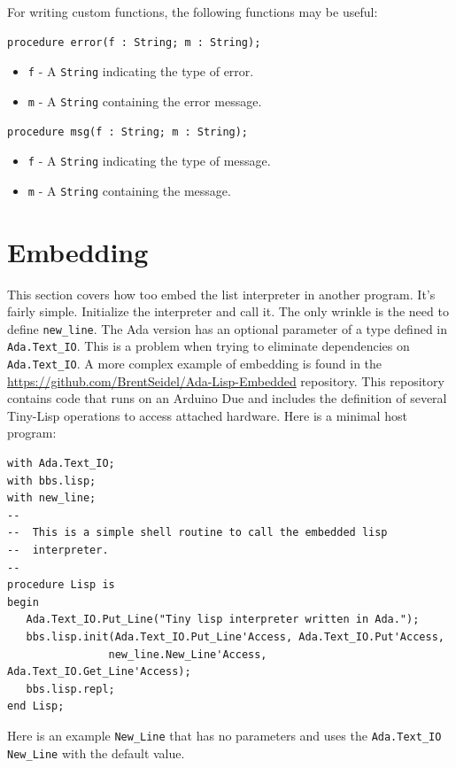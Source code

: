 \documentclass[10pt, openany]{book}
\newcommand{\package}[1]{\texttt{#1}}
\newcommand{\function}[1]{\texttt{#1}}
\newcommand{\keyword}[1]{\texttt{#1}}
\newcommand{\datatype}[1]{\texttt{#1}}
\newcommand{\tl}{Tiny-Lisp}
\begin{document}
For writing custom functions, the following functions may be useful:
\begin{lstlisting}
procedure error(f : String; m : String);
\end{lstlisting}
\begin{itemize}
  \item \keyword{f} - A \datatype{String} indicating the type of error.
  \item \keyword{m} - A \datatype{String} containing the error message.
\end{itemize}
\begin{lstlisting}
procedure msg(f : String; m : String);
\end{lstlisting}
\begin{itemize}
  \item \keyword{f} - A \datatype{String} indicating the type of message.
  \item \keyword{m} - A \datatype{String} containing the message.
\end{itemize}

\section{Embedding}
This section covers how too embed the list interpreter in another program.  
It's fairly simple.  Initialize the interpreter and call it.  The only wrinkle is the need to define \function{new\_line}.  The Ada version has an optional parameter of a type defined in \package{Ada.Text\_IO}.  This is a problem when trying to eliminate dependencies on \package{Ada.Text\_IO}.  A more complex example of embedding is found in the \url{https://github.com/BrentSeidel/Ada-Lisp-Embedded} repository.  This repository contains code that runs on an Arduino Due and includes the definition of several \tl{} operations to access attached hardware.  Here is a minimal host program:
\begin{lstlisting}
with Ada.Text_IO;
with bbs.lisp;
with new_line;
--
--  This is a simple shell routine to call the embedded lisp
--  interpreter.
--
procedure Lisp is
begin
   Ada.Text_IO.Put_Line("Tiny lisp interpreter written in Ada.");
   bbs.lisp.init(Ada.Text_IO.Put_Line'Access, Ada.Text_IO.Put'Access,
                new_line.New_Line'Access, Ada.Text_IO.Get_Line'Access);
   bbs.lisp.repl;
end Lisp;
\end{lstlisting}

Here is an example \function{New\_Line} that has no parameters and uses the \package{Ada.Text\_IO} \function{New\_Line} with the default value.
\end{document}

